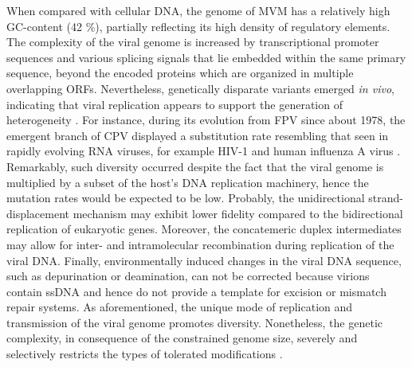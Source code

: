 When compared with cellular DNA, the genome of MVM has a relatively high GC-content (42 \%), partially reflecting its high density of regulatory elements. The complexity of the viral genome is increased by transcriptional promoter sequences and various splicing signals that lie embedded within the same primary sequence, beyond the encoded proteins which are organized in multiple overlapping ORFs. Nevertheless, genetically disparate variants emerged \textit{in vivo}, indicating that viral replication appears to support the generation of heterogeneity \cite{pmid12552010}. For instance, during its evolution from FPV since about 1978, the emergent branch of CPV displayed a substitution rate resembling that seen in rapidly evolving RNA viruses, for example HIV-1 and human influenza A virus \cite{pmid15626758}. Remarkably, such diversity occurred despite the fact that the viral genome is multiplied by a subset of the host's DNA replication machinery, hence the mutation rates would be expected to be low. Probably, the unidirectional strand-displacement mechanism may exhibit lower fidelity compared to the bidirectional replication of eukaryotic genes. Moreover, the concatemeric duplex intermediates may allow for inter- and intramolecular recombination during replication of the viral DNA. Finally, environmentally induced changes in the viral DNA sequence, such as depurination or deamination, can not be corrected because virions contain ssDNA and hence do not provide a template for excision or mismatch repair systems. As aforementioned, the unique mode of replication and transmission of the viral genome promotes diversity. Nonetheless, the genetic complexity, in consequence of the constrained genome size, severely and selectively restricts the types of tolerated modifications \cite{telomere}.   


